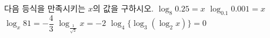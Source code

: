 다음 등식을 만족시키는 $x$의 값을 구하시오.
 $\log_8 0.25=x$
 $\log_{0.1} 0.001=x$
 $\log_x 81=-\dfrac{4}{3}$
 $\log_{\frac{1}{\sqrt{2}}} x=-2$
 $\log_4 \{\log_3 (\log_2 x)\}=0$
